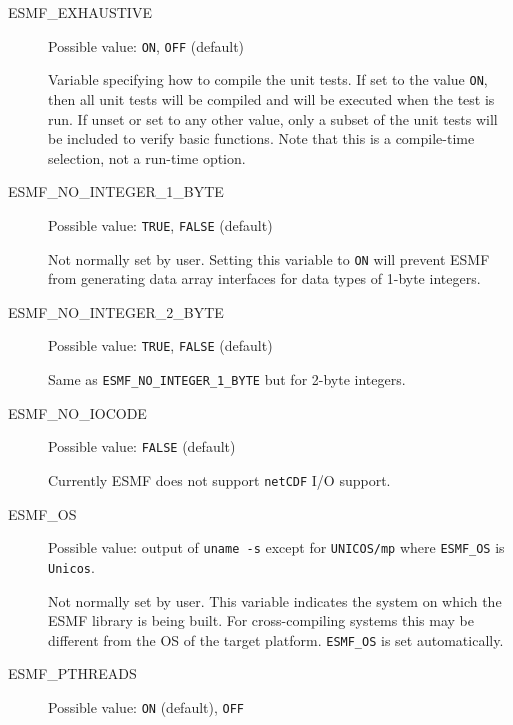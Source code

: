 \begin{description}
\item[ESMF\_EXHAUSTIVE] 
Possible value: {\tt ON}, {\tt OFF} (default)

Variable specifying how to compile the unit tests. If set to the value {\tt ON},
then all unit tests will be compiled and will be executed when the test is
run.  If unset or set to any other value, only a subset of the unit tests
will be included to verify basic functions. Note that this is a compile-time
selection, not a run-time option.

\item[ESMF\_NO\_INTEGER\_1\_BYTE]
Possible value: {\tt TRUE}, {\tt FALSE} (default)

Not normally set by user. Setting this variable to {\tt ON} will prevent ESMF
from generating data array interfaces for data types of 1-byte integers.

\item[ESMF\_NO\_INTEGER\_2\_BYTE] 
Possible value: {\tt TRUE}, {\tt FALSE} (default)

Same as {\tt ESMF\_NO\_INTEGER\_1\_BYTE} but for 2-byte integers.

\item[ESMF\_NO\_IOCODE] 
Possible value: {\tt FALSE} (default)

Currently ESMF does not support {\tt netCDF} I/O support.

\item[ESMF\_OS]
Possible value: output of {\tt uname -s} except for {\tt UNICOS/mp} where
{\tt ESMF\_OS} is {\tt Unicos}.

Not normally set by user. This variable indicates the system on which the ESMF
library is being built. For cross-compiling systems this may be different from 
the OS of the target platform. {\tt ESMF\_OS} is set automatically.

\item[ESMF\_PTHREADS]
Possible value: {\tt ON} (default), {\tt OFF}


\end{description}
